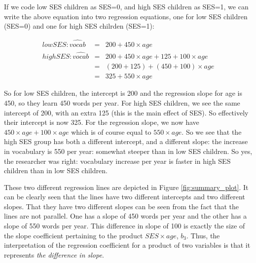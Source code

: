 If we code low SES children as SES=0, and high SES children as SES=1, we can write the above equation into two regression equations, one for low SES children (SES=0) and one for high SES chilrden (SES=1):

\begin{eqnarray}
low SES: \widehat{vocab} &=&  200 + 450 \times age   \\
high SES: \widehat{vocab} &=& 200 + 450 \times age + 125  + 100   \times age\\
&=& (200 + 125) + (450 + 100) \times age \nonumber\\
&=& 325 + 550 \times age \nonumber
\end{eqnarray}

So for low SES children, the intercept is 200 and the regression slope for age is 450, so they learn 450 words per year. For high SES children, we see the same intercept of 200, with an extra 125 (this is the main effect of SES). So effectively their intercept is now 325. For the regression slope, we now have $450 \times age+ 100   \times age$ which is of course equal to $550 \times age$. So we see that the high SES group has both a different intercept, and a different slope: the increase in vocabulary is 550 per year: somewhat steeper than in low SES children. So yes, the researcher was right: vocabulary increase per year is faster in high SES children than in low SES children.

These two different regression lines are depicted in Figure \ref{fig:summary_plot}. It can be clearly seen that the lines have two different intercepts and two different slopes. That they have two different slopes can be seen from the fact that the lines are not parallel. One has a slope of 450 words per year and the other has a slope of 550 words per year. This difference in slope of 100 is exactly the size of the slope coefficient pertaining to the product $SES \times age$, $b_3$. Thus, the interpretation of the regression coefficient for a product of two variables is that it represents \textit{the difference in slope}.

\begin{knitrout}
\color{fgcolor}\begin{kframe}


{\ttfamily\noindent\bfseries{}}\end{kframe}
\end{knitrout}


